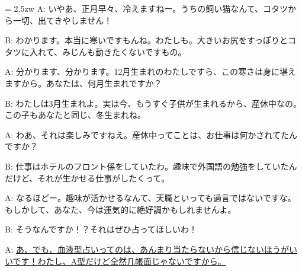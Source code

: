 \documentclass[11pt]{amsart}
\title{}
\author{}
\newenvironment{hangall}[1]{\hangindent = 2.5zw\everypar{\hangindent = 2.5zw}}{}
\begin{document}
\maketitle
\begin{hangall}{}%
A: いやあ、正月早々、冷えますねー。うちの飼い猫なんて、コタツから一切、出てきやしません！

B: わかります。本当に寒いですもんね。わたしも。大きいお尻をすっぽりとコタツに入れて、みじんも動きたくないですもの。

A: 分かります、分かります。12月生まれのわたしですら、この寒さは身に堪えますから。あなたは、何月生まれですか？

B: わたしは3月生まれよ。実は今、もうすぐ子供が生まれるから、産休中なの。この子もあなたと同じ、冬生まれね。

A: わあ、それは楽しみですねえ。産休中ってことは、お仕事は何かされてたんですか？

B: 仕事はホテルのフロント係をしていたわ。趣味で外国語の勉強をしていたんだけど、それが生かせる仕事がしたくって。

A: なるほどー。趣味が活かせるなんて、天職といっても過言ではないですな。もしかして、あなた、今は運気的に絶好調かもしれませんよ。

B: そうなんですか！？それはぜひ占ってほしいわ！

A: \ul{あ、でも、血液型占いってのは、あんまり当たらないから信じないほうがいいです！わたし、A型だけど全然几帳面じゃないですから。}\end{hangall}
\end{document}
